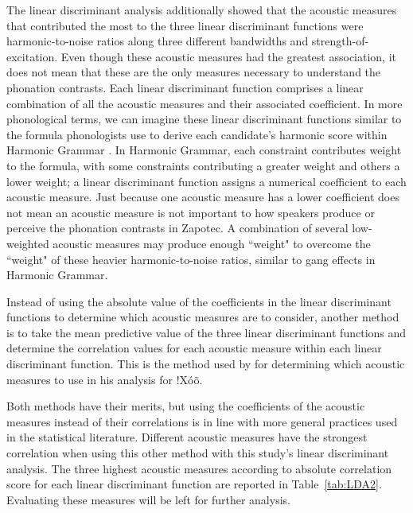 \documentclass[12pt, letterpaper]{article}
\begin{document}
The linear discriminant analysis additionally showed that the acoustic measures that contributed the most to the three linear discriminant functions were harmonic-to-noise ratios along three different bandwidths and strength-of-excitation. Even though these acoustic measures had the greatest association, it does not mean that these are the only measures necessary to understand the phonation contrasts. Each linear discriminant function comprises a linear combination of all the acoustic measures and their associated coefficient. In more phonological terms, we can imagine these linear discriminant functions similar to the formula phonologists use to derive each candidate's harmonic score within Harmonic Grammar \citep{smolenskyHarmonicMindNeural2006}. In Harmonic Grammar, each constraint contributes weight to the formula, with some constraints contributing a greater weight and others a lower weight; a linear discriminant function assigns a numerical coefficient to each acoustic measure. Just because one acoustic measure has a lower coefficient does not mean an acoustic measure is not important to how speakers produce or perceive the phonation contrasts in Zapotec. A combination of several low-weighted acoustic measures may produce enough ``weight" to overcome the ``weight" of these heavier harmonic-to-noise ratios, similar to gang effects in Harmonic Grammar. 

Instead of using the absolute value of the coefficients in the linear discriminant functions to determine which acoustic measures are to consider, another method is to take the mean predictive value of the three linear discriminant functions and determine the correlation values for each acoustic measure within each linear discriminant function. This is the method used by \citet{garellekAcousticDiscriminabilityComplex2020} for determining which acoustic measures to use in his analysis for !Xóõ. 

Both methods have their merits, but using the coefficients of the acoustic measures instead of their correlations is in line with more general practices used in the statistical literature. Different acoustic measures have the strongest correlation when using this other method with this study's linear discriminant analysis. The three highest acoustic measures according to absolute correlation score for each linear discriminant function are reported in Table~\ref{tab:LDA2}. Evaluating these measures will be left for further analysis. 
\end{document}

